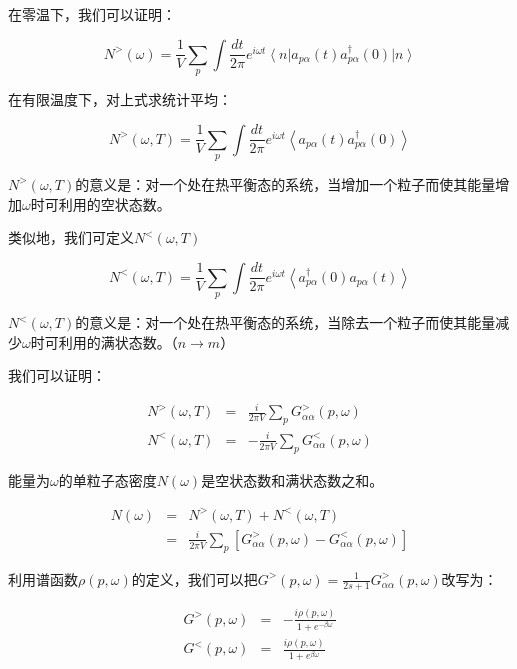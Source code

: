 在零温下，我们可以证明：

\begin{equation}
N^{>} (\omega) = \frac{1}{V} \sum\limits_p \int \frac{dt }{2 \pi } e^{i \omega t } \left\langle n \right|  a_{p \alpha} (t)  a^{\dagger}_{p \alpha} (0) \left| n  \right\rangle
\end{equation}

在有限温度下，对上式求统计平均：

\begin{equation}
N^{>} (\omega , T) = \frac{1}{V}  \sum\limits_p \int \frac{dt }{2 \pi } e^{i \omega t } \left\langle a_{p \alpha} (t) a^{\dagger}_{p \alpha } (0) \right\rangle
\end{equation}

$N^{>} (\omega, T)$的意义是：对一个处在热平衡态的系统，当增加一个粒子而使其能量增加$\omega $时可利用的空状态数。

类似地，我们可定义$N^{<} (\omega , T )$

\begin{equation}
N^{<} (\omega , T) = \frac{1}{V}  \sum\limits_p \int \frac{dt }{2 \pi } e^{i \omega t } \left\langle  a^{\dagger}_{p \alpha } (0)  a_{p \alpha} (t)  \right\rangle
\end{equation}

$N^{<} (\omega, T)$的意义是：对一个处在热平衡态的系统，当除去一个粒子而使其能量减少$\omega $时可利用的满状态数。（$ n \to m$）

我们可以证明：

\begin{eqnarray}
N^{>} (\omega, T) &=& \frac{i}{2 \pi V } \sum\limits_p G^{>}_{\alpha \alpha} (p, \omega)  \\
N^{<} (\omega, T) &=& - \frac{i }{2 \pi V} \sum\limits_p G^{<}_{\alpha \alpha} (p, \omega) 
\end{eqnarray}

能量为$\omega $的单粒子态密度$N(\omega)$是空状态数和满状态数之和。

\begin{eqnarray*}
N(\omega ) & = & N^{>} (\omega, T ) + N^{<} (\omega, T ) \\
{} & = & \frac{i }{2 \pi V} \sum\limits_p \left[ G^{>}_{\alpha \alpha} (p, \omega) - G^{<}_{\alpha \alpha} (p, \omega) \right]
\end{eqnarray*}

利用谱函数$\rho(p, \omega) $的定义，我们可以把$G^{>} (p, \omega) = \frac{1}{2s+1} G_{\alpha \alpha}^{> } (p, \omega) $改写为：

\begin{eqnarray}
G^{>} (p, \omega) &=& - \frac{i \rho(p, \omega)}{1+ e^{- \beta \omega}  }  \\
G^{<} (p, \omega) &=& \frac{i \rho(p, \omega) }{1 + e^{\beta \omega}}
\end{eqnarray}

